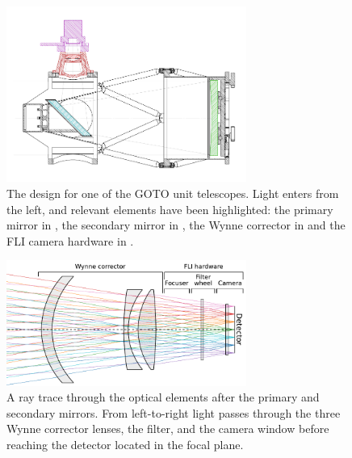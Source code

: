 \begin{colsection}
\begin{colsection}
\newpage

\begin{figure}[p]
    \begin{center}
        \includegraphics[width=0.7\textwidth]{images/throughput/OTA_optics.png}
    \end{center}
    \caption[GOTO optical telescope assembly]{
        The  design for one of the GOTO unit telescopes. Light enters from the left, and relevant elements have been highlighted: the primary mirror in , the secondary mirror in , the Wynne corrector in  and the FLI camera hardware in .
    }\label{fig:ota}
\end{figure}

\begin{figure}[p]
    \begin{center}
        \includegraphics[width=0.7\textwidth]{images/throughput/wynne.pdf}
    \end{center}
    \caption[Ray tracing the corrector elements]{
        A ray trace through the optical elements after the primary and secondary mirrors. From left-to-right light passes through the three Wynne corrector lenses, the filter, and the camera window before reaching the detector located in the focal plane.
    }\label{fig:wynne}
\end{figure}


\end{colsection}
\end{colsection}

